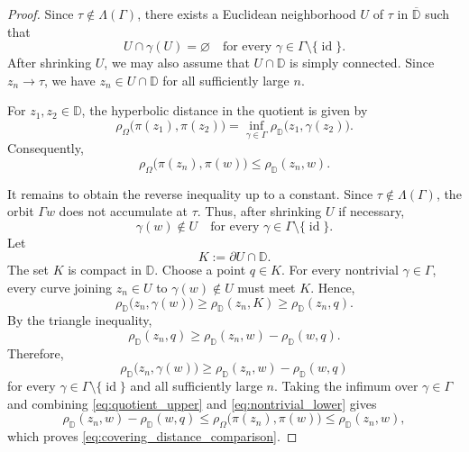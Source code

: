 \documentclass[12pt]{amsart}
\numberwithin{equation}{section}
\theoremstyle{plain}
\theoremstyle{definition}
\begin{document}
\begin{proof}
Since $\tau\notin\Lambda(\Gamma)$, there exists a Euclidean neighborhood
$U$ of $\tau$ in $\overline{\mathbb D}$ such that
\begin{equation*}
\label{eq:U_disjoint_translates}
U\cap\gamma(U)=\varnothing
\quad
\text{for every }\gamma\in\Gamma\setminus\{\operatorname{id}\}.
\end{equation*}
After shrinking $U$, we may also assume that $U\cap\mathbb D$ is
simply connected. Since $z_n\to\tau$, we have
$z_n\in U\cap\mathbb D$ for all sufficiently large $n$.

For $z_1,z_2\in\mathbb D$, the hyperbolic distance in the quotient is
given by
\begin{equation*}
\label{eq:quotient_distance}
\rho_\Omega\bigl(\pi(z_1),\pi(z_2)\bigr)
=
\inf_{\gamma\in\Gamma}
\rho_{\mathbb D}\bigl(z_1,\gamma(z_2)\bigr).
\end{equation*}
Consequently,
\begin{equation}
\label{eq:quotient_upper}
\rho_\Omega\bigl(\pi(z_n),\pi(w)\bigr)
\le
\rho_{\mathbb D}(z_n,w).
\end{equation}

It remains to obtain the reverse inequality up to a constant. Since
$\tau\notin\Lambda(\Gamma)$, the orbit $\Gamma w$ does not accumulate at
$\tau$. Thus, after shrinking $U$ if necessary,
\begin{equation*}
\label{eq:orbit_avoids_U}
\gamma(w)\notin U
\quad
\text{for every }\gamma\in\Gamma\setminus\{\operatorname{id}\}.
\end{equation*}
Let
\begin{equation*}
K:=\partial U\cap\mathbb D.
\end{equation*}
The set $K$ is compact in $\mathbb D$. Choose a point $q\in K$. For every
nontrivial $\gamma\in\Gamma$, every curve joining $z_n\in U$ to
$\gamma(w)\notin U$ must meet $K$. Hence,
\begin{equation*}
\rho_{\mathbb D}\bigl(z_n,\gamma(w)\bigr)
\ge
\rho_{\mathbb D}(z_n,K)
\ge
\rho_{\mathbb D}(z_n,q).
\end{equation*}
By the triangle inequality,
\begin{equation*}
\rho_{\mathbb D}(z_n,q)
\ge
\rho_{\mathbb D}(z_n,w)-\rho_{\mathbb D}(w,q).
\end{equation*}
Therefore,
\begin{equation}
\label{eq:nontrivial_lower}
\rho_{\mathbb D}\bigl(z_n,\gamma(w)\bigr)
\ge
\rho_{\mathbb D}(z_n,w)-\rho_{\mathbb D}(w,q)
\end{equation}
for every $\gamma\in\Gamma\setminus\{\operatorname{id}\}$ and all
sufficiently large $n$. Taking the infimum over $\gamma\in\Gamma$ and
combining \eqref{eq:quotient_upper} and \eqref{eq:nontrivial_lower} gives
\begin{equation*}
\rho_{\mathbb D}(z_n,w)-\rho_{\mathbb D}(w,q)
\le
\rho_\Omega\bigl(\pi(z_n),\pi(w)\bigr)
\le
\rho_{\mathbb D}(z_n,w),
\end{equation*}
which proves \eqref{eq:covering_distance_comparison}.
\end{proof}
\end{document}
